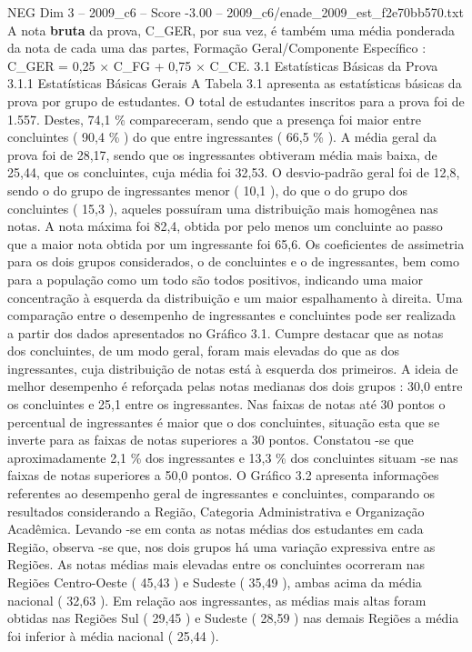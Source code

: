 \begin{textsample}{NEG Dim 3 – 2009\_c6 – Score -3.00 – 2009\_c6/enade\_2009\_est\_f2e70bb570.txt}
A nota \textbf{bruta} da prova, C\_GER, por sua vez, é também uma média ponderada da nota de cada uma das partes, Formação Geral/Componente Específico : C\_GER = 0,25 × C\_FG + 0,75 × C\_CE. 3.1 Estatísticas Básicas da Prova 3.1.1 Estatísticas Básicas Gerais A Tabela 3.1 apresenta as estatísticas básicas da prova por grupo de estudantes.
O total de estudantes inscritos para a prova foi de 1.557.
Destes, 74,1 \% compareceram, sendo que a presença foi maior entre concluintes ( 90,4 \% ) do que entre ingressantes ( 66,5 \% ).
A média geral da prova foi de 28,17, sendo que os ingressantes obtiveram média mais baixa, de 25,44, que os concluintes, cuja média foi 32,53.
O desvio-padrão geral foi de 12,8, sendo o do grupo de ingressantes menor ( 10,1 ), do que o do grupo dos concluintes ( 15,3 ), aqueles possuíram uma distribuição mais homogênea nas notas.
A nota máxima foi 82,4, obtida por pelo menos um concluinte ao passo que a maior nota obtida por um ingressante foi 65,6.
Os coeficientes de assimetria para os dois grupos considerados, o de concluintes e o de ingressantes, bem como para a população como um todo são todos positivos, indicando uma maior concentração à esquerda da distribuição e um maior espalhamento à direita.
Uma comparação entre o desempenho de ingressantes e concluintes pode ser realizada a partir dos dados apresentados no Gráfico 3.1.
Cumpre destacar que as notas dos concluintes, de um modo geral, foram mais elevadas do que as dos ingressantes, cuja distribuição de notas está à esquerda dos primeiros.
A ideia de melhor desempenho é reforçada pelas notas medianas dos dois grupos : 30,0 entre os concluintes e 25,1 entre os ingressantes.
Nas faixas de notas até 30 pontos o percentual de ingressantes é maior que o dos concluintes, situação esta que se inverte para as faixas de notas superiores a 30 pontos.
Constatou -se que aproximadamente 2,1 \% dos ingressantes e 13,3 \% dos concluintes situam -se nas faixas de notas superiores a 50,0 pontos.
O Gráfico 3.2 apresenta informações referentes ao desempenho geral de ingressantes e concluintes, comparando os resultados considerando a Região, Categoria Administrativa e Organização Acadêmica.
Levando -se em conta as notas médias dos estudantes em cada Região, observa -se que, nos dois grupos há uma variação expressiva entre as Regiões.
As notas médias mais elevadas entre os concluintes ocorreram nas Regiões Centro-Oeste ( 45,43 ) e Sudeste ( 35,49 ), ambas acima da média nacional ( 32,63 ).
Em relação aos ingressantes, as médias mais altas foram obtidas nas Regiões Sul ( 29,45 ) e Sudeste ( 28,59 ) nas demais Regiões a média foi inferior à média nacional ( 25,44 ).

\end{textsample}
